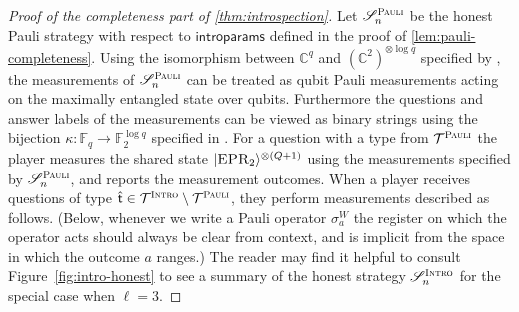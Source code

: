 \documentclass[11pt]{article}
\theoremstyle{definition}
\newcommand{\ket}[1]{|#1\rangle}
\newcommand{\C}{\ensuremath{\mathbb{C}}}
\newcommand{\F}{\ensuremath{\mathbb{F}}}
\newcommand{\strategy}{\mathscr{S}}
\newcommand{\type}{\mathcal{T}}
\newcommand{\gamestyle}[1]{\ensuremath{\textsc{#1}}\xspace}
\newcommand{\pauli}{\gamestyle{Pauli}}
\newcommand{\intro}{\gamestyle{Intro}}
\newcommand{\labelstyle}[1]{\ensuremath{\textsc{#1}}\xspace}
\newcommand{\EPR}{\labelstyle{EPR}}
\newcommand{\tvarstyle}[1]{\mathsf{#1}}
\newcommand{\tvar}{\ensuremath{\tvarstyle{t}}}
\newcommand{\introparams}{\mathsf{introparams}}
\begin{document}
\begin{proof}[Proof of the completeness part of \cref{thm:introspection}]
  Let $\strategy^\pauli_n$ be the honest Pauli strategy with respect to
  $\introparams$ defined in the proof of \cref{lem:pauli-completeness}. Using the 
  isomorphism between $\C^q$ and $(\C^2)^{\otimes \log q}$ specified by ,
 the measurements   of $\strategy^\pauli_n$ can be treated as qubit Pauli measurements acting on the
  maximally entangled state over qubits. Furthermore the questions and answer labels
  of the measurements can be viewed as binary strings
 using the bijection $\kappa: \F_q \to \F_2^{\log q}$ specified in .
  For a question with a type from $\type^\pauli$ the player measures the shared state
  $\ket{\EPR_2}^{\otimes (Q+1)}$ using the measurements specified by
  $\strategy^\pauli_n$, and reports the measurement outcomes.
  When a player receives questions of type $\hat{\tvar} \in \type^\intro
  \setminus \type^\pauli$, they perform measurements described as follows.
  (Below, whenever we write a Pauli operator $\sigma^W_a$ the register on which
  the operator acts should always be clear from context, and is implicit from
  the space in which the outcome $a$ ranges.)
  The reader may find it helpful to consult Figure~\ref{fig:intro-honest} to see
  a summary of the honest strategy $\strategy^\intro_n$ for the special case
  when $\ell = 3$.


\end{proof}
\end{document}
